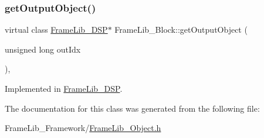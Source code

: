 \mbox{\label{class_frame_lib___block_a9e8bb5dcd9954618de9a8e3ad27c16a9}} 
\subsubsection{\texorpdfstring{get\+Output\+Object()}{getOutputObject()}}
{\footnotesize\ttfamily virtual class \hyperlink{class_frame_lib___d_s_p}{Frame\+Lib\+\_\+\+D\+SP}$\ast$ Frame\+Lib\+\_\+\+Block\+::get\+Output\+Object (\begin{DoxyParamCaption}\item[{unsigned long}]{out\+Idx }\end{DoxyParamCaption})\hspace{0.3cm}{\ttfamily [protected]}, {}}



Implemented in \hyperlink{class_frame_lib___d_s_p_a867822cfa9e3ca491c886cff9f79001d}{Frame\+Lib\+\_\+\+D\+SP}.



The documentation for this class was generated from the following file\+:\begin{DoxyCompactItemize}
\item 
Frame\+Lib\+\_\+\+Framework/\hyperlink{_frame_lib___object_8h}{Frame\+Lib\+\_\+\+Object.\+h}\end{DoxyCompactItemize}
